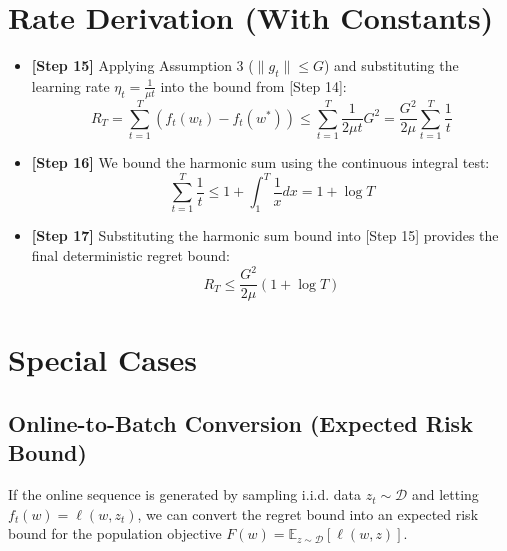 \documentclass[12pt]{article}
\begin{document}
\section*{Rate Derivation (With Constants)}
\begin{itemize}
    \item \textbf{[Step 15]} Applying Assumption 3 ($\|g_t\| \leq G$) and substituting the learning rate $\eta_t = \frac{1}{\mu t}$ into the bound from [Step 14]:
    $$R_T = \sum_{t=1}^T (f_t(w_t) - f_t(w^*)) \leq \sum_{t=1}^T \frac{1}{2\mu t} G^2 = \frac{G^2}{2\mu} \sum_{t=1}^T \frac{1}{t}$$
    
    \item \textbf{[Step 16]} We bound the harmonic sum using the continuous integral test:
    $$\sum_{t=1}^T \frac{1}{t} \leq 1 + \int_1^T \frac{1}{x} dx = 1 + \log T$$
    
    \item \textbf{[Step 17]} Substituting the harmonic sum bound into [Step 15] provides the final deterministic regret bound:
    $$R_T \leq \frac{G^2}{2\mu} (1 + \log T)$$
\end{itemize}

\section*{Special Cases}
\subsection*{Online-to-Batch Conversion (Expected Risk Bound)}
If the online sequence is generated by sampling i.i.d. data $z_t \sim \mathcal{D}$ and letting $f_t(w) = \ell(w, z_t)$, we can convert the regret bound into an expected risk bound for the population objective $F(w) = \mathbb{E}_{z \sim \mathcal{D}}[\ell(w, z)]$.
\end{document}
